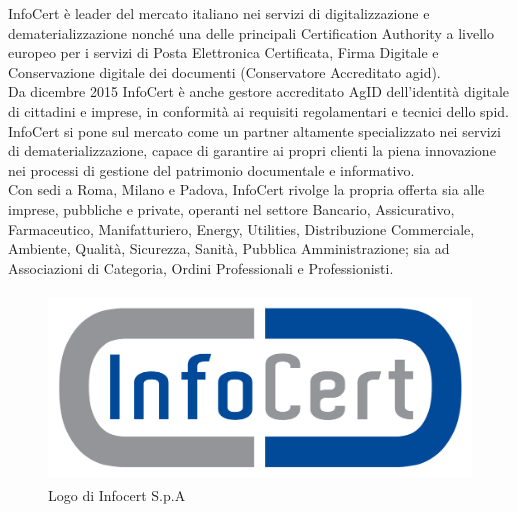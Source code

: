 InfoCert è leader del mercato italiano nei servizi di digitalizzazione e dematerializzazione nonché una delle principali Certification Authority a livello europeo per i servizi di Posta Elettronica Certificata, Firma Digitale e Conservazione digitale dei documenti (Conservatore Accreditato \gls{agid}).\\
Da dicembre 2015 InfoCert è anche gestore accreditato AgID dell’identità digitale di cittadini e imprese, in conformità ai requisiti regolamentari e tecnici dello \gls{spid}. \\
InfoCert si pone sul mercato come un partner altamente specializzato nei servizi di dematerializzazione, capace di garantire ai propri clienti la piena innovazione nei processi di gestione del patrimonio documentale e informativo. \\
Con sedi a Roma, Milano e Padova, InfoCert rivolge la propria offerta sia alle imprese, pubbliche e private, operanti nel settore Bancario, Assicurativo, Farmaceutico, Manifatturiero, Energy, Utilities, Distribuzione Commerciale, Ambiente, Qualità, Sicurezza, Sanità, Pubblica Amministrazione; sia ad Associazioni di Categoria, Ordini Professionali e Professionisti.
\begin{figure}[h]
	\centering
	\includegraphics[height=5cm]{immagini/logo-infocert}
	\caption{Logo di Infocert S.p.A}
	\label{img-infocert-logo}
\end{figure}